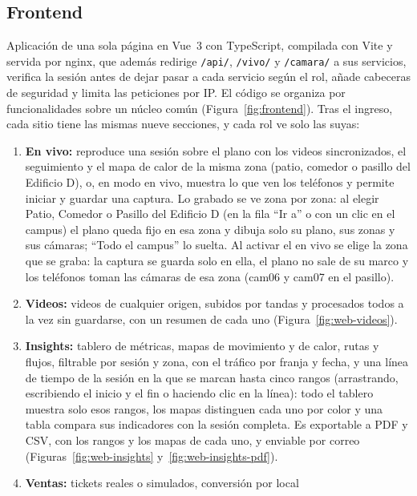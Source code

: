 \documentclass[12pt,a4paper]{article}
\begin{document}
\FloatBarrier
\subsection{Frontend}

Aplicación de una sola página en Vue~3 con TypeScript, compilada con Vite y
servida por nginx, que además redirige \texttt{/api/}, \texttt{/vivo/} y
\texttt{/camara/} a sus servicios, verifica la sesión antes de dejar pasar a
cada servicio según el rol, añade cabeceras de seguridad y limita las
peticiones por IP. El código se organiza por funcionalidades sobre un núcleo
común (Figura~\ref{fig:frontend}). Tras el ingreso, cada sitio tiene las mismas
nueve secciones, y cada rol ve solo las suyas:

\begin{enumerate}
    \item \textbf{En vivo:} reproduce una sesión sobre el plano con los videos
    sincronizados, el seguimiento y el mapa de calor de la misma zona (patio,
    comedor o pasillo del Edificio D), o, en modo en vivo, muestra lo que ven
    los teléfonos y permite iniciar y guardar una captura. Lo grabado se ve
    zona por zona: al elegir Patio, Comedor o Pasillo del Edificio D (en la
    fila ``Ir a'' o con un clic en el campus) el plano queda fijo en esa zona
    y dibuja solo su plano, sus zonas y sus cámaras; ``Todo el campus'' lo
    suelta. Al activar el en vivo se elige la zona que se graba: la captura
    se guarda solo en ella, el plano no sale de su marco y los teléfonos
    toman las cámaras de esa zona (cam06 y cam07 en el pasillo).
    \item \textbf{Videos:} videos de cualquier origen, subidos por tandas y
    procesados todos a la vez sin guardarse, con un resumen de cada uno
    (Figura~\ref{fig:web-videos}).
    \item \textbf{Insights:} tablero de métricas, mapas de movimiento y de
    calor, rutas y flujos, filtrable por sesión y zona, con el tráfico por
    franja y fecha, y una línea de tiempo de la sesión en la que se marcan
    hasta cinco rangos (arrastrando, escribiendo el inicio y el fin o
    haciendo clic en la línea): todo el tablero muestra solo esos rangos, los
    mapas distinguen cada uno por color y una tabla compara sus indicadores
    con la sesión completa. Es exportable a PDF y CSV, con los rangos y los
    mapas de cada uno, y enviable por correo
    (Figuras~\ref{fig:web-insights} y~\ref{fig:web-insights-pdf}).
    \item \textbf{Ventas:} tickets reales o simulados, conversión por local

\end{enumerate}
\end{document}
